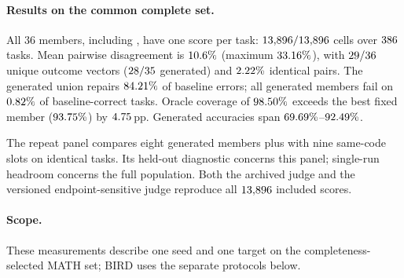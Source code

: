 \paragraph{Results on the common complete set.}
All $36$ members, including \bare{}, have one score per task:
$13{,}896/13{,}896$ cells over $386$ tasks.
Mean pairwise disagreement is $10.6\%$
(maximum $33.16\%$), with $29/36$ unique
outcome vectors ($28/35$ generated) and
$2.22\%$ identical pairs. The generated union repairs
$84.21\%$ of baseline errors; all generated members fail on
$0.82\%$ of baseline-correct tasks. Oracle coverage of
$98.50\%$ exceeds the best fixed member \bare{}
($93.75\%$) by $4.75$\,pp.
Generated accuracies span $69.69\%$--$92.49\%$.

The repeat panel compares eight generated members plus \bare{} with
nine same-code slots on identical tasks. Its held-out diagnostic concerns
this panel; single-run headroom concerns the full population. Both the
archived judge and the versioned endpoint-sensitive judge reproduce all
$13{,}896$ included scores.

\paragraph{Scope.}
These measurements describe one seed and one target on the
completeness-selected MATH set; BIRD uses the separate protocols below.
